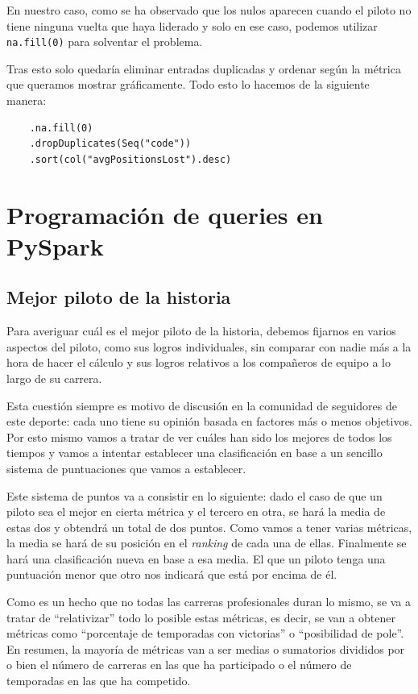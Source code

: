 \documentclass[12pt,twoside,titlepage]{report}
\newcommand{\quotes}[1]{``#1''}
\begin{document}
En nuestro caso, como se ha observado que los nulos aparecen cuando el piloto no tiene ninguna vuelta que haya liderado y solo en ese caso, podemos utilizar \texttt{na.fill(0)} para solventar el problema.

Tras esto solo quedaría eliminar entradas duplicadas y ordenar según la métrica que queramos mostrar gráficamente. Todo esto lo hacemos de la siguiente manera:

\begin{lstlisting}
	.na.fill(0)
	.dropDuplicates(Seq("code"))
	.sort(col("avgPositionsLost").desc)  
\end{lstlisting}

\section{Programación de queries en PySpark}
\label{extrapython}

\subsection{Mejor piloto de la historia}

Para averiguar cuál es el mejor piloto de la historia, debemos fijarnos en varios aspectos del piloto, como sus logros individuales, sin comparar con nadie más a la hora de hacer el cálculo y sus logros relativos a los compañeros de equipo a lo largo de su carrera.

Esta cuestión siempre es motivo de discusión en la comunidad de seguidores de este deporte: cada uno tiene su opinión basada en factores más o menos objetivos. Por esto mismo vamos a tratar de ver cuáles han sido los mejores de todos los tiempos y vamos a intentar establecer una clasificación en base a un sencillo sistema de puntuaciones que vamos a establecer.

Este sistema de puntos va a consistir en lo siguiente: dado el caso de que un piloto sea el mejor en cierta métrica y el tercero en otra, se hará la media de estas dos y obtendrá un total de dos puntos. Como vamos a tener varias métricas, la media se hará de su posición en el \textit{ranking} de cada una de ellas. Finalmente se hará una clasificación nueva en base a esa media. El que un piloto tenga una puntuación menor que otro nos indicará que está por encima de él.

Como es un hecho que no todas las carreras profesionales duran lo mismo, se va a tratar de \quotes{relativizar} todo lo posible estas métricas, es decir, se van a obtener métricas como \quotes{porcentaje de temporadas con victorias} o \quotes{posibilidad de pole}. En resumen, la mayoría de métricas van a ser medias o sumatorios divididos por o bien el número de carreras en las que ha participado o el número de temporadas en las que ha competido.
\end{document}
